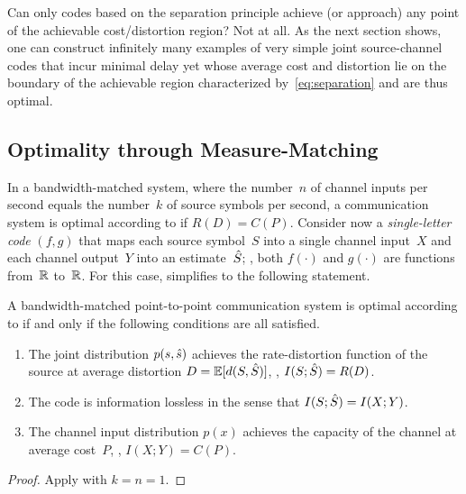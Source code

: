 Can only codes based on the separation principle achieve (or approach) any point
of the achievable cost\slash distortion region? Not at all. As the next section
shows, one can construct infinitely many examples of very simple joint
source-channel codes that incur minimal delay yet whose average cost and
distortion lie on the boundary of the achievable region characterized
by~\eqref{eq:separation} and are thus optimal. 


\subsection{Optimality through Measure-Matching}

In a bandwidth-matched system, where the number~$n$ of channel inputs per second
equals the number~$k$ of source symbols per second, a communication system is
optimal according to  if $R(D) = C(P)$. Consider now a
\emph{single-letter code} $(f, g)$ that maps each source symbol~$S$ into a
single channel input~$X$ and each channel output~$Y$ into an estimate~${\hat{S}}$;
\ie, both $f(\cdot)$ and $g(\cdot)$ are functions from~$\mathbb{R}$ to~$\mathbb{R}$. For this
case,  simplifies to the following statement.

\begin{theorem}
  \label{thm:sloptimality}
  A bandwidth-matched point-to-point communication system is optimal according
  to  if and only if the following conditions are all
  satisfied.
  \begin{enumerate}
    \item The joint distribution $p(s,{\hat{s}})$ achieves the rate-distortion
      function of the source at average distortion $D = \mathbb{E}[d(S,{\hat{S}})]$, \ie,
      $I(S;{\hat{S}}) = R(D)$.

    \item The code is information lossless in the sense that $I(S;{\hat{S}}) =
      I(X;Y)$. 

    \item The channel input distribution $p(x)$ achieves the capacity of the
      channel at average cost~$P$, \ie, $I(X;Y) = C(P)$. 
  \end{enumerate}
\end{theorem}

\begin{proof}
  Apply  with $k = n = 1$.
\end{proof}


